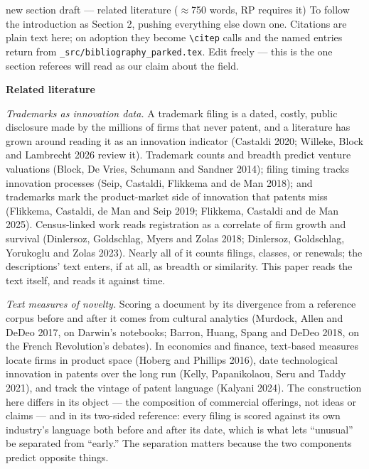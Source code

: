 \begin{ericbox}{new section draft --- related literature ($\approx$750 words, RP requires it)}
To follow the introduction as Section 2, pushing everything else down one.
Citations are plain text here; on adoption they become \verb|\citep| calls
and the named entries return from
\texttt{\_src/bibliography\_parked.tex}. Edit freely --- this is the one
section referees will read as our claim about the field.

\medskip\noindent\textbf{Related literature}

\medskip\noindent\emph{Trademarks as innovation data.} A trademark filing
is a dated, costly, public disclosure made by the millions of firms that
never patent, and a literature has grown around reading it as an
innovation indicator (Castaldi 2020; Willeke, Block and Lambrecht 2026
review it). Trademark counts and breadth predict venture valuations
(Block, De Vries, Schumann and Sandner 2014); filing timing tracks
innovation processes (Seip, Castaldi, Flikkema and de Man 2018); and
trademarks mark the product-market side of innovation that patents miss
(Flikkema, Castaldi, de Man and Seip 2019; Flikkema, Castaldi and de Man
2025). Census-linked work reads registration as a correlate of firm
growth and survival (Dinlersoz, Goldschlag, Myers and Zolas 2018;
Dinlersoz, Goldschlag, Yorukoglu and Zolas 2023). Nearly all of it counts
filings, classes, or renewals; the descriptions' text enters, if at all,
as breadth or similarity. This paper reads the text itself, and reads it
against time.

\medskip\noindent\emph{Text measures of novelty.} Scoring a document by
its divergence from a reference corpus before and after it comes from
cultural analytics (Murdock, Allen and DeDeo 2017, on Darwin's notebooks;
Barron, Huang, Spang and DeDeo 2018, on the French Revolution's debates).
In economics and finance, text-based measures locate firms in product
space (Hoberg and Phillips 2016), date technological innovation in
patents over the long run (Kelly, Papanikolaou, Seru and Taddy 2021), and
track the vintage of patent language (Kalyani 2024). The construction
here differs in its object --- the composition of commercial offerings,
not ideas or claims --- and in its two-sided reference: every filing is
scored against its own industry's language both before and after its
date, which is what lets ``unusual'' be separated from ``early.'' The
separation matters because the two components predict opposite things.


\end{ericbox}

